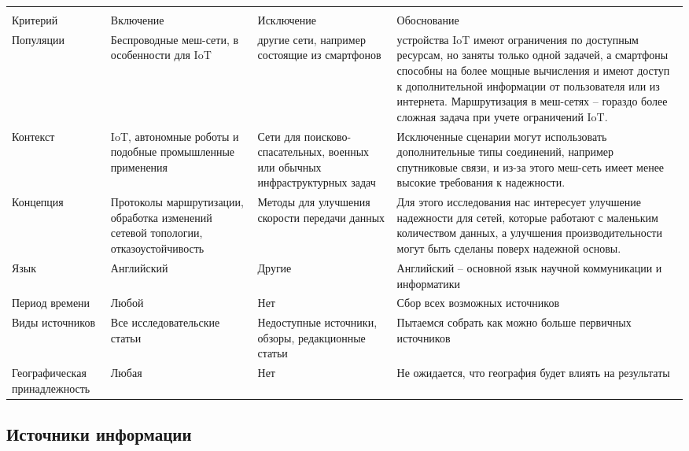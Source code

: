\documentclass[%
]{report}
\begin{document}


\begin{footnotesize}
\begin{tabularx}{\textwidth}{|X|X|X|X|}
\hline \\
  Критерий & Включение & Исключение & Обоснование \\ \hline\hline
Популяции & Беспроводные меш-сети, в особенности для IoT & другие сети,
например состоящие из смартфонов & 

устройства IoT имеют ограничения
по доступным ресурсам,
но заняты только одной задачей,
а смартфоны способны на более мощные вычисления
и имеют доступ к дополнительной информации от пользователя
или из интернета.
Маршрутизация в меш-сетях -- гораздо более сложная задача при
учете ограничений IoT. \\ \hline
Контекст & IoT, автономные роботы и подобные промышленные применения &
Сети для поисково-спасательных, военных или обычных инфраструктурных задач &
Исключенные сценарии могут использовать дополнительные типы соединений,
например спутниковые связи,
и из-за этого меш-сеть имеет менее высокие требования к надежности. \\ \hline
Концепция & Протоколы маршрутизации, обработка изменений сетевой топологии,
отказоустойчивость & Методы для улучшения скорости передачи данных &
Для этого исследования нас интересует улучшение надежности
для сетей, которые работают с маленьким количеством данных,
а улучшения производительности могут быть сделаны поверх надежной основы. \\ \hline
Язык & Английский & Другие & Английский -- основной язык научной коммуникации
и информатики \\ \hline
Период времени & Любой & Нет & Сбор всех возможных источников \\ \hline
Виды источников & Все исследовательские статьи & Недоступные источники, обзоры,
редакционные статьи & Пытаемся собрать как можно больше первичных источников \\ \hline
Географическая принадлежность & Любая & Нет & Не ожидается, что
география будет влиять на результаты
 \\
\hline
\end{tabularx}
\end{footnotesize}

\subsection{Источники информации}\label{information-sources}
\end{document}
